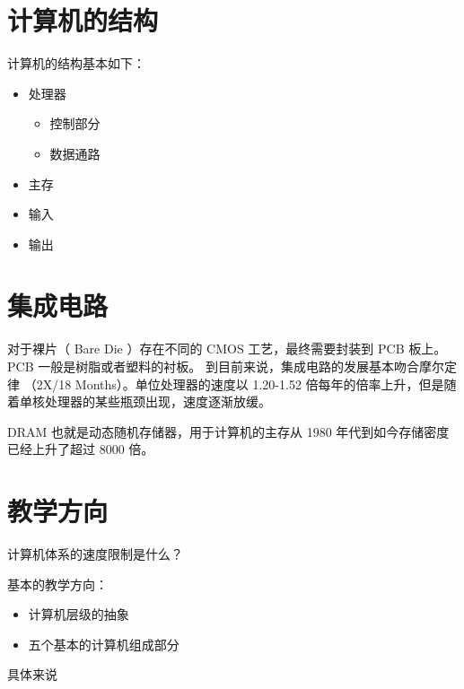 \documentclass[cn,11pt,chinese,black,simple]{../elegantbook}
\begin{document}
\section{计算机的结构}

计算机的结构基本如下：

\begin{itemize}
    \item 处理器
    \begin{itemize}
        \item 控制部分
        \item 数据通路
    \end{itemize}
    \item 主存
    \item 输入
    \item 输出
\end{itemize}

\section{集成电路}

对于裸片（ Bare Die ）存在不同的 CMOS 工艺，最终需要封装到 PCB 板上。 PCB 一般是树脂或者塑料的衬板。
到目前来说，集成电路的发展基本吻合摩尔定律 （2X/18 Months）。单位处理器的速度以 1.20-1.52 倍每年的倍率上升，但是随着单核处理器的某些瓶颈出现，速度逐渐放缓。

DRAM 也就是动态随机存储器，用于计算机的主存从 1980 年代到如今存储密度已经上升了超过 8000 倍。

\section{教学方向}

计算机体系的速度限制是什么？

基本的教学方向：

\begin{itemize}
    \item 计算机层级的抽象
    \item 五个基本的计算机组成部分
\end{itemize}

具体来说
\end{document}
